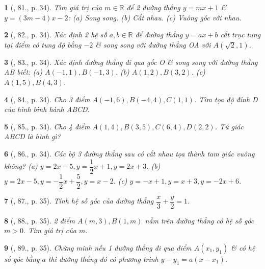 \documentclass{article}
\newtheorem{baitoan}{}
\begin{document}
\begin{baitoan}[\cite{Binh_Toan_9_tap_1}, 81., p. 34]
	Tìm giá trị của $m\in\mathbb{R}$ để 2 đường thẳng $y = mx + 1$ \& $y = (3m - 4)x - 2$: (a) Song song. (b) Cắt nhau. (c) Vuông góc với nhau.
\end{baitoan}

\begin{baitoan}[\cite{Binh_Toan_9_tap_1}, 82., p. 34]
	Xác định 2 hệ số $a,b\in\mathbb{R}$ để đường thẳng $y = ax + b$ cắt trục tung tại điểm có tung độ bằng $-2$ \& song song với đường thẳng OA với $A(\sqrt{2},1)$.
\end{baitoan}

\begin{baitoan}[\cite{Binh_Toan_9_tap_1}, 83., p. 34]
	Xác định đường thẳng đi qua gốc O \& song song với đường thẳng AB biết: (a) $A(-1,1),B(-1,3)$. (b) $A(1,2),B(3,2)$. (c) $A(1,5),B(4,3)$.
\end{baitoan}

\begin{baitoan}[\cite{Binh_Toan_9_tap_1}, 84., p. 34]
	Cho 3 điểm $A(-1,6),B(-4,4),C(1,1)$. Tìm tọa độ đỉnh D của hình bình hành ABCD.
\end{baitoan}

\begin{baitoan}[\cite{Binh_Toan_9_tap_1}, 85., p. 34]
	Cho 4 điểm $A(1,4),B(3,5),C(6,4),D(2,2)$. Tứ giác ABCD là hình gì?
\end{baitoan}

\begin{baitoan}[\cite{Binh_Toan_9_tap_1}, 86., p. 34]
	Các bộ 3 đường thẳng sau có cắt nhau tọa thành tam giác vuông không? (a) $y = 2x - 5,y = \dfrac{1}{2}x + 1,y = 2x + 3$. (b) $y = 2x - 5,y = -\dfrac{1}{2}x + \dfrac{5}{2},y = x - 2$. (c) $y = -x + 1,y = x + 3,y = -2x + 6$.
\end{baitoan}

\begin{baitoan}[\cite{Binh_Toan_9_tap_1}, 87., p. 35]
	Tính hệ số góc của đường thẳng $\dfrac{x}{3} + \dfrac{y}{2} = 1$.
\end{baitoan}

\begin{baitoan}[\cite{Binh_Toan_9_tap_1}, 88., p. 35]
	2 điểm $A(m,3),B(1,m)$ nằm trên đường thẳng có hệ số góc $m > 0$. Tìm giá trị của $m$.
\end{baitoan}

\begin{baitoan}[\cite{Binh_Toan_9_tap_1}, 89., p. 35]
	Chứng minh nếu 1 đường thẳng đi qua điểm $A(x_1,y_1)$ \& có hệ số góc bằng $a$ thì đường thẳng đó có phương trình $y - y_1 = a(x - x_1)$.
\end{baitoan}
\end{document}
